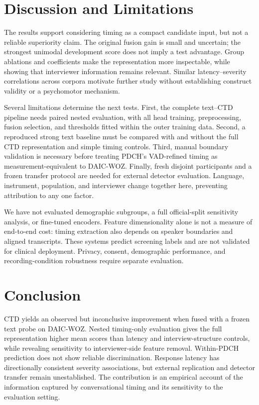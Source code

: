 \documentclass{article}
\begin{document}
\section{Discussion and Limitations}
\label{sec:discussion}
The results support considering timing as a compact candidate input, but not a reliable superiority claim. The original fusion gain is small and uncertain; the strongest unimodal development score does not imply a test advantage. Group ablations and coefficients make the representation more inspectable, while showing that interviewer information remains relevant. Similar latency--severity correlations across corpora motivate further study without establishing construct validity or a psychomotor mechanism.

Several limitations determine the next tests. First, the complete text--CTD pipeline needs paired nested evaluation, with all head training, preprocessing, fusion selection, and thresholds fitted within the outer training data. Second, a reproduced strong text baseline must be compared with and without the full CTD representation and simple timing controls. Third, manual boundary validation is necessary before treating PDCH's VAD-refined timing as measurement-equivalent to DAIC-WOZ. Finally, fresh disjoint participants and a frozen transfer protocol are needed for external detector evaluation. Language, instrument, population, and interviewer change together here, preventing attribution to any one factor.

We have not evaluated demographic subgroups, a full official-split sensitivity analysis, or fine-tuned encoders. Feature dimensionality alone is not a measure of end-to-end cost: timing extraction also depends on speaker boundaries and aligned transcripts. These systems predict screening labels and are not validated for clinical deployment. Privacy, consent, demographic performance, and recording-condition robustness require separate evaluation.

\section{Conclusion}
CTD yields an observed but inconclusive improvement when fused with a frozen text probe on DAIC-WOZ. Nested timing-only evaluation gives the full representation higher mean scores than latency and interview-structure controls, while revealing sensitivity to interviewer-side feature removal. Within-PDCH prediction does not show reliable discrimination. Response latency has directionally consistent severity associations, but external replication and detector transfer remain unestablished. The contribution is an empirical account of the information captured by conversational timing and its sensitivity to the evaluation setting.



\end{document}
